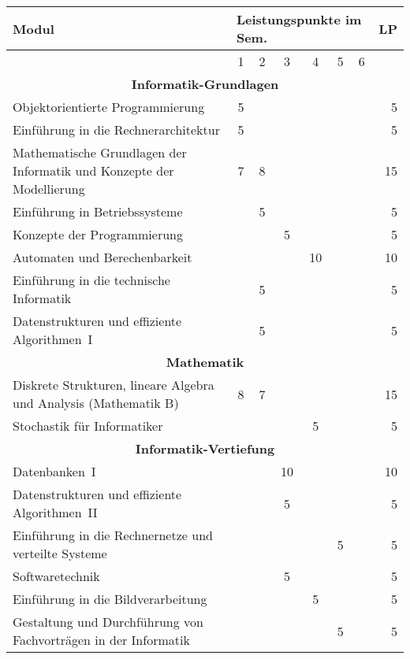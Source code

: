 \begin{table}[btp]
    \begin{small}
    \begin{tabularx}{\textwidth}{|X||c|c|c|c|c|c||r|}
        \hline
        \textbf{Modul}&\multicolumn{6}{l||}{\textbf{Leistungspunkte im Sem.}}&\textbf{LP}\\\hline
        &1&2&3&4&5&6&\\\hline\hline
        \multicolumn{8}{|c|}{\textbf{Informatik-Grundlagen}}\\\hline
        Objektorientierte Programmierung&5&&&&&&5\\\hline
        Einführung in die Rechnerarchitektur&5&&&&&&5\\\hline
        Mathematische Grundlagen der Informatik und Konzepte der Modellierung &7&8&&&&&15\\\hline
        Einführung in Betriebssysteme&&5&&&&&5\\\hline
        Konzepte der Programmierung&&&5&&&&5\\\hline
        Automaten und Berechenbarkeit&&&&10&&&10\\\hline
        Einführung in die technische Informatik&&5&&&&&5\\\hline
        Datenstrukturen und effiziente Algorithmen~I&&5&&&&&5\\\hline\hline
        \multicolumn{8}{|c|}{\textbf{Mathematik}}\\\hline
        Diskrete Strukturen, lineare Algebra und Analysis (Mathematik B)&8&7&&&&&15\\\hline
        Stochastik für Informatiker&&&&5&&&5\\\hline\hline
        \multicolumn{8}{|c|}{\textbf{Informatik-Vertiefung}}\\\hline
        Datenbanken~I&&&10&&&&10\\\hline
        Datenstrukturen und effiziente Algorithmen~II&&&5&&&&5\\\hline
        Einführung in die Rechnernetze und verteilte Systeme&&&&&5&&5\\\hline
        Softwaretechnik&&&5&&&&5\\\hline
        Einführung in die Bildverarbeitung&&&&5&&&5\\\hline
        Gestaltung und Durchführung von Fachvorträgen in der Informatik&&&&&5&&5\\\hline

\end{tabularx}
\end{small}
\end{table}
